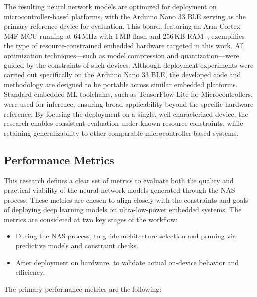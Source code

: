 The resulting neural network models are optimized for deployment on microcontroller-based platforms, with the Arduino Nano 33 BLE serving as the primary reference device for evaluation. This board, featuring an Arm Cortex-M4F MCU running at 64\,MHz with 1\,MB flash and 256\,KB RAM~\cite{ArduinoNano}, exemplifies the type of resource-constrained embedded hardware targeted in this work. All optimization techniques---such as model compression and quantization---were guided by the constraints of such devices. Although deployment experiments were carried out specifically on the Arduino Nano 33 BLE, the developed code and methodology are designed to be portable across similar embedded platforms. Standard embedded ML toolchains, such as TensorFlow Lite for Microcontrollers, were used for inference, ensuring broad applicability beyond the specific hardware reference. By focusing the deployment on a single, well-characterized device, the research enables consistent evaluation under known resource constraints, while retaining generalizability to other comparable microcontroller-based systems.


\clearpage

\subsection{Performance Metrics}

This research defines a clear set of metrics to evaluate both the quality and practical viability of the neural network models generated through the NAS process. These metrics are chosen to align closely with the constraints and goals of deploying deep learning models on ultra-low-power embedded systems. The metrics are considered at two key stages of the workflow:
\begin{itemize}
    \item During the NAS process, to guide architecture selection and pruning via predictive models and constraint checks.
\end{itemize}
\begin{itemize}
    \item After deployment on hardware, to validate actual on-device behavior and efficiency.
\end{itemize}
The primary performance metrics are the following:

\begin{comment}
\textbf{Inference latency}

This refers to the time it takes for the deployed model to process an input and produce a prediction on the Arduino Nano 33 BLE. Latency is critical in real-time embedded applications—such as gesture recognition, audio processing, or sensor data classification—where delayed responses can compromise functionality or user experience. Measuring latency ensures that the model is fast enough for time-sensitive applications.
\end{comment}


